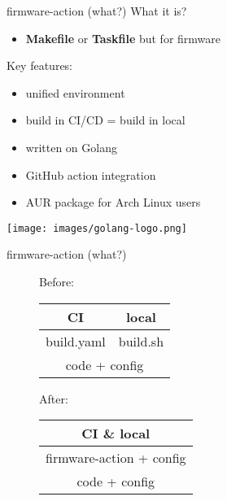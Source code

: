 \documentclass{beamer}
\begin{document}
\begin{frame}{firmware-action (what?)}
	What it is?
	\begin{itemize}
	\item{\textbf{Makefile} or \textbf{Taskfile} but for firmware}
	\end{itemize}
	\vspace{20px}

	Key features:
	\begin{itemize}
	\item{unified environment}
	\item{build in CI/CD = build in local}
	\item{written on Golang}
	\item{GitHub action integration}
	\item{AUR package for Arch Linux users}
	\end{itemize}

	\centering
	\texttt{[image: images/golang-logo.png]}
\end{frame}

\begin{frame}{firmware-action (what?)}
	\begin{figure}
	\centering
	\begin{minipage}{.5\textwidth}
		Before:
		\vspace{20px}

		\begin{tabular}{ |c|c| }
			\hline
			\textbf{CI} & \textbf{local} \\
			\hline
			\hline
			build.yaml & build.sh \\
			\hline
			\multicolumn{2}{|c|}{code + config} \\
			\hline
		\end{tabular}
	\end{minipage}%
	\begin{minipage}{.5\textwidth}
		After:
		\vspace{20px}

		\begin{tabular}{ |c| }
			\hline
			\textbf{CI \& local} \\
			\hline
			\hline
			firmware-action + config \\
			\hline
			code + config \\
			\hline
		\end{tabular}
	\end{minipage}
	\end{figure}
\end{frame}
\end{document}
